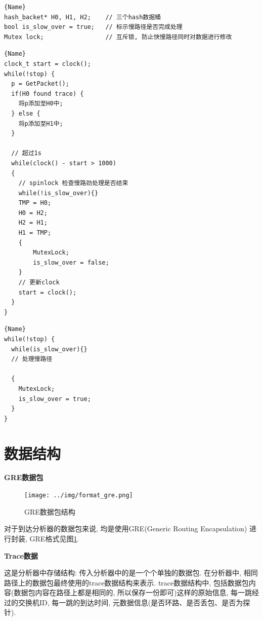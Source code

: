 \begin{lstlisting}[caption=数据结构,frame=tlrb]{Name}
hash_backet* H0, H1, H2;    // 三个hash数据桶
bool is_slow_over = true;   // 标示慢路径是否完成处理
Mutex lock;                 // 互斥锁, 防止快慢路径同时对数据进行修改
\end{lstlisting}

\noindent\begin{minipage}{.55\textwidth}
\begin{lstlisting}[caption=快路径线程,frame=tlrb]{Name}
clock_t start = clock();
while(!stop) {
  p = GetPacket();
  if(H0 found trace) {
    将p添加至H0中;
  } else {
    将p添加至H1中;
  }

  // 超过1s
  while(clock() - start > 1000)
  {
    // spinlock 检查慢路劲处理是否结束
    while(!is_slow_over){}
    TMP = H0;
    H0 = H2;
    H2 = H1;
    H1 = TMP;
    {
        MutexLock;
        is_slow_over = false;
    }
    // 更新clock
    start = clock();
  }
}
\end{lstlisting}
\end{minipage}\hfill
\begin{minipage}{.38\textwidth}
\begin{lstlisting}[caption=慢路径线程,frame=tlrb]{Name}
while(!stop) {
  while(is_slow_over){}
  // 处理慢路径

  {
    MutexLock;
    is_slow_over = true;
  }
}
\end{lstlisting}
\end{minipage}

\section{数据结构}

\textbf{GRE数据包}

\begin{figure}[htbp!]
  \centering
  \texttt{[image: ../img/format\_gre.png]}
  \caption{GRE数据包结构}
  \label{fig:gre_packet}
\end{figure}

对于到达分析器的数据包来说, 均是使用GRE(Generic Routing Encapsulation)
进行封装, GRE格式见图\ref{fig:gre_packet}.

\textbf{Trace数据}

这是分析器中存储结构: 传入分析器中的是一个个单独的数据包.
在分析器中, 相同路径上的数据包最终使用的trace数据结构来表示. trace数据结构中,
包括数据包内容(数据包内容在路径上都是相同的, 所以保存一份即可)这样的原始信息,
每一跳经过的交换机ID, 每一跳的到达时间, 元数据信息(是否环路、是否丢包、是否为探针).

